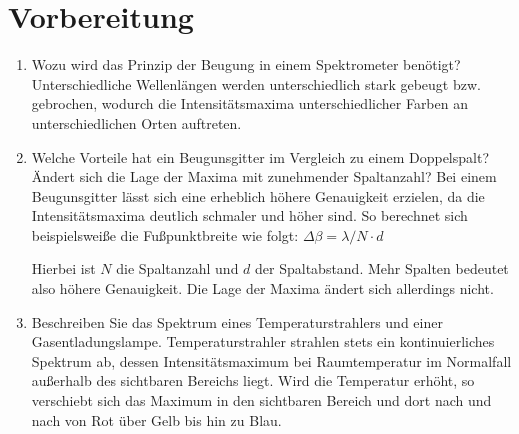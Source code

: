 \section{Vorbereitung}
\begin{enumerate}
	\item Wozu wird das Prinzip der Beugung in einem Spektrometer benötigt?
		\subitem Unterschiedliche Wellenlängen werden unterschiedlich stark gebeugt bzw. gebrochen, wodurch die Intensitätsmaxima unterschiedlicher Farben an unterschiedlichen Orten auftreten.
	\item Welche Vorteile hat ein Beugunsgitter im Vergleich zu einem Doppelspalt? Ändert sich die Lage der Maxima mit zunehmender Spaltanzahl?
		\subitem Bei einem Beugunsgitter lässt sich eine erheblich höhere Genauigkeit erzielen, da die Intensitätsmaxima deutlich schmaler und höher sind. So berechnet sich beispielsweiße die Fußpunktbreite wie folgt: $\Delta\beta=\lambda/N\cdot d$
		
		Hierbei ist $N$ die Spaltanzahl und $d$ der Spaltabstand. Mehr Spalten bedeutet also höhere Genauigkeit. Die Lage der Maxima ändert sich allerdings nicht.
	\item Beschreiben Sie das Spektrum eines Temperaturstrahlers und einer Gasentladungslampe.
		\subitem Temperaturstrahler strahlen stets ein kontinuierliches Spektrum ab, dessen Intensitätsmaximum bei Raumtemperatur im Normalfall außerhalb des sichtbaren Bereichs liegt. Wird die Temperatur erhöht, so verschiebt sich das Maximum in den sichtbaren Bereich und dort nach und nach von Rot über Gelb bis hin zu Blau.
		

\end{enumerate}
